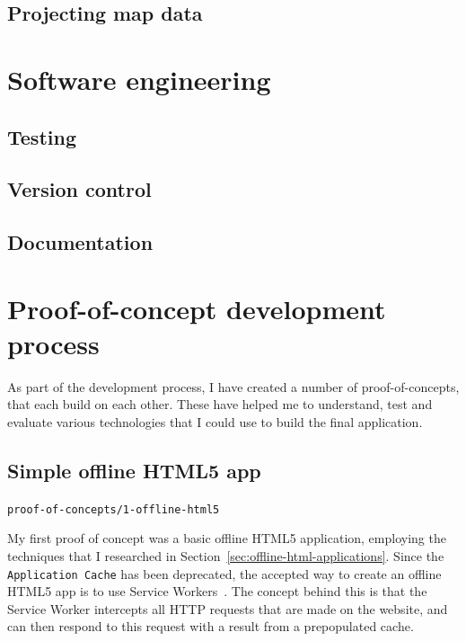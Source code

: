 \documentclass[]{final_report}
\begin{document}


\section{Projecting map data}\label{sec:projecting-map-data}



\chapter{Software engineering}


\section{Testing}

\section{Version control}

\section{Documentation}

\chapter{Proof-of-concept development process}


As part of the development process, I have created a number of proof-of-concepts, that each build on each other. These have helped me to understand, test and evaluate various technologies that I could use to build the final application.

\section{Simple offline HTML5 app}

\hfill \texttt{proof-of-concepts/1-offline-html5}

My first proof of concept was a basic offline HTML5 application, employing the techniques that I researched in Section~\ref{sec:offline-html-applications}. Since the \texttt{Application Cache} has been deprecated, the accepted way to create an offline HTML5 app is to use Service Workers~\cite{w3c-service-workers-caches}. The concept behind this is that the Service Worker intercepts all HTTP requests that are made on the website, and can then respond to this request with a result from a prepopulated cache.
\end{document}
